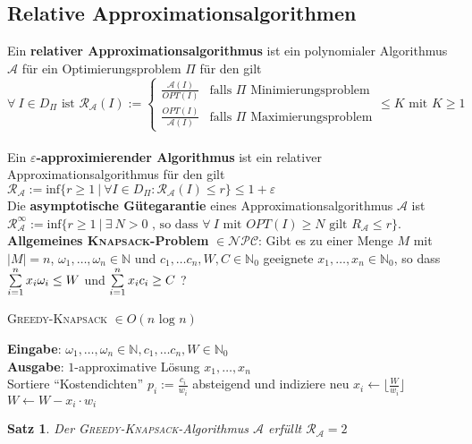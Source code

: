 \documentclass[a4paper,10pt]{scrartcl}
\newcommand{\tbf}{\textbf}
\newcommand{\tsc}{\textsc}
\newcommand{\agn}{\leftarrow}
\newcommand{\nat}{\mathbb{N}}
\newcommand{\natn}{\mathbb{N}_0}
\newcommand{\NPC}{\mathcal{NPC}}
\newcommand{\calA}{\mathcal{A}}
\newcommand{\calR}{\mathcal{R}}
\newcommand{\Eingabe}[1]{\STATE \tbf{Eingabe}: #1 \\}
\newcommand{\Ausgabe}[1]{\STATE \tbf{Ausgabe}: #1 \\}
\newtheorem{satz}{Satz}
\begin{document}
\subsection{Relative Approximationsalgorithmen}
Ein \tbf{relativer Approximationsalgorithmus} ist ein polynomialer Algorithmus $\calA$ für ein Optimierungsproblem $\Pi$ für den gilt 
$$\forall \ I \in D_\Pi \text{ ist } \calR_\calA(I) := \begin{cases} \frac{\calA(I)}{OPT(I)} & \text{falls } \Pi \text{ Minimierungsproblem} \\ \frac{OPT(I)}{\calA(I)} & \text{falls } \Pi \text{ Maximierungsproblem} \end{cases} \leq K \text{ mit } K \geq 1$$ \\

Ein \tbf{$\varepsilon$-approximierender Algorithmus} ist ein relativer Approximationsalgorithmus für den gilt $\calR_\calA := \text{inf}\{ r \geq 1 \ | \ \forall I \in D_\Pi: \calR_\calA(I) \leq r \} \leq 1 + \varepsilon$ \\

Die \tbf{asymptotische Gütegarantie} eines Approximationsalgorithmus $\calA$ ist \\ 
$\calR_\calA^\infty := \text{inf}\{ r \geq 1 \ | \ \exists \ N > 0 \text{ , so dass } \forall \ I \text{ mit } OPT(I) \geq N \text{ gilt } R_\calA \leq r \}$. \\

\tbf{Allgemeines \tsc{Knapsack}-Problem} $\in \NPC$: Gibt es zu einer Menge $M$ mit $|M| = n$, $\omega_1, \ldots, \omega_n \in \nat$ und $c_1, \ldots c_n, W, C \in \natn$ geeignete $x_1, \ldots, x_n \in \natn$, so dass $\sum_{i = 1}^n \limits x_i \omega_i \leq W$ und $\sum_{i = 1}^n \limits x_i c_i \geq C$ ? \\

\begin{algorithm}
\caption{\tsc{Greedy-Knapsack} $\in O(n \text{ log } n)$}
\begin{algorithmic}
\Eingabe{$\omega_1, \ldots, \omega_n \in \nat, c_1, \ldots c_n, W \in \natn$}
\Ausgabe{$1$-approximative Lösung $x_1, \ldots, x_n$}
\STATE Sortiere ``Kostendichten'' $p_i := \frac{c_i}{w_i}$ absteigend und indiziere neu
	\STATE $x_i \agn \lfloor \frac{W}{w_i} \rfloor$
	\STATE $W \agn W - x_i \cdot w_i$
\ENDFOR
\end{algorithmic}
\end{algorithm}

\begin{satz}
 Der \tsc{Greedy-Knapsack}-Algorithmus $\calA$ erfüllt $\calR_\calA = 2$
\end{satz}
\end{document}

